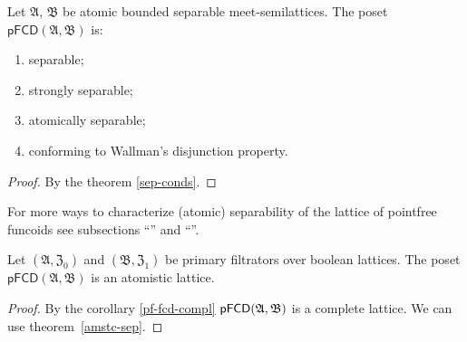 \begin{cor}
\label{pf-fcd-is-sep}Let $\mathfrak{A}$, $\mathfrak{B}$ be atomic bounded separable meet-semilattices. The poset $\mathsf{pFCD}(\mathfrak{A},\mathfrak{B})$
is:
\begin{enumerate}
\item separable;
\item strongly separable;
\item atomically separable;
\item conforming to Wallman's disjunction property.
\end{enumerate}
\end{cor}
\begin{proof}
By the theorem \ref{sep-conds}.\end{proof}
\begin{rem}
For more ways to characterize (atomic) separability of the lattice
of pointfree funcoids see subsections ``''
and ``''.\end{rem}
\begin{cor}
\label{pf-atomistic}Let $(\mathfrak{A},\mathfrak{Z}_{0})$ and $(\mathfrak{B},\mathfrak{Z}_{1})$
be primary filtrators over boolean lattices. The poset $\mathsf{pFCD}(\mathfrak{A},\mathfrak{B})$
is an atomistic lattice.\end{cor}
\begin{proof}
By the corollary \ref{pf-fcd-compl} $\text{\ensuremath{\mathsf{pFCD}(\mathfrak{A},\mathfrak{B})}}$
is a complete lattice. We can use theorem~\ref{amstc-sep}.\end{proof}

